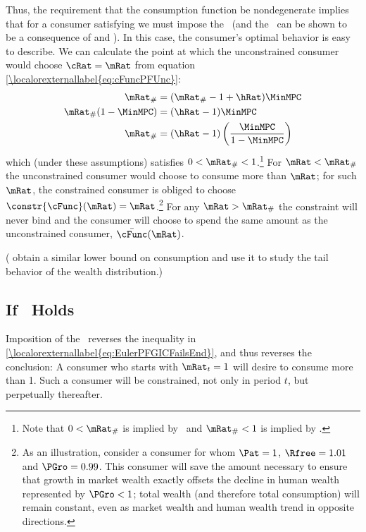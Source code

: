 \documentclass[\econtexRoot/BufferStockTheory]{subfiles}
\begin{document}
Thus, the requirement that the consumption function be nondegenerate
implies that for a consumer satisfying \cncl{\PFGIC} we must impose
the \RIC~(and the \FHWC~can be shown to be a consequence of \cncl{\PFGIC} and \RIC).  In
this case, the consumer's optimal behavior is easy to describe.  We
can calculate the point at which the unconstrained consumer would
choose $\cRat = \mRat$ from equation \eqref{\localorexternallabel{eq:cFuncPFUnc}}:
\begin{equation}\begin{gathered}\begin{aligned}
  \mRat_{\#}  & = (\mRat_{\#}-1+\hRat)\MinMPC
  \\ \mRat_{\#}(1-\MinMPC)  & = (\hRat - 1)\MinMPC
  \\ \mRat_{\#}  & = (\hRat - 1)\left(\frac{\MinMPC}{1-\MinMPC}\right)
\end{aligned}\end{gathered}\end{equation}
which (under these assumptions) satisfies $0 < \mRat_{\#} < 1$.\footnote{Note that $0 < \mRat_{\#}$ is implied by \RIC~and $ \mRat_{\#}<1$ is implied by \cncl{\PFGIC}.}  For
$\mRat < \mRat_{\#}$ the unconstrained consumer would choose to
consume more than $\mRat$; for such $\mRat$, the constrained consumer
is obliged to choose $\constr{\cFunc}(\mRat) = \mRat$.\footnote{As an
  illustration, consider a consumer for whom $\Pat = 1$, $\Rfree
  =1.01$ and $\PGro = 0.99$.  This consumer will save the amount
  necessary to ensure that growth in market wealth exactly offsets the
  decline in human wealth represented by $\PGro < 1$; total wealth
  (and therefore total consumption) will remain constant, even as
  market wealth and human wealth trend in opposite directions.}  For
any $\mRat > \mRat_{\#}$ the constraint will never bind and the
consumer will choose to spend the same amount as the unconstrained
consumer, $\bar{\cFunc}(\mRat)$.

(\cite{StachurskiToda2019JET} obtain a similar lower bound on consumption and use it to study the tail behavior of the wealth distribution.)


\subsection{If \PFGIC~Holds}

Imposition of the \PFGIC~reverses the inequality in
\eqref{\localorexternallabel{eq:EulerPFGICFailsEnd}}, and thus
reverses the conclusion: A consumer who starts with $\mRat_{t}=1$ will
desire to consume more than 1.  Such a consumer will be constrained,
not only in period $t$, but perpetually thereafter.
\end{document}
